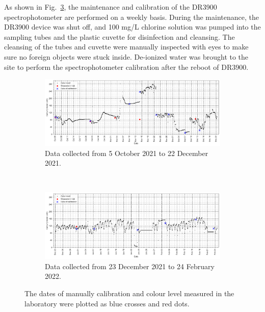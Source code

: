 As shown in Fig.~\ref{fig:colour-calibration-lab-sampling}, the maintenance and calibration of the DR3900 spectrophotometer are performed on a weekly basis. During the maintenance, the DR3900 device was shut off, and 100 mg/L chlorine solution was pumped into the sampling tubes and the plastic cuvette for disinfection and cleansing. The cleansing of the tubes and cuvette were manually inspected with eyes to make sure no foreign objects were stuck inside. De-ionized water was brought to the site to perform the spectrophotometer calibration after the reboot of DR3900.

\begin{figure}[!ht]
  \centering
  \begin{subfigure}[t]{1.0\textwidth}
    \includegraphics[width=\linewidth]{imgs/leachate-effluent-blend-ratio-color-plot/first-80d.png}
    \caption{Data collected from 5 October 2021 to 22 December 2021.} \label{fig:data-oct}
  \end{subfigure}\\
  \vspace{2em}%
  \begin{subfigure}[t]{1.0\textwidth}
    \includegraphics[width=\linewidth]{imgs/leachate-effluent-blend-ratio-color-plot/second-80d.png}
    \caption{Data collected from 23 December 2021 to 24 February 2022.} \label{fig:data-nov}
  \end{subfigure}%
\caption{The dates of manually calibration and colour level measured in the laboratory were plotted as blue crosses and red dots.} \label{fig:colour-calibration-lab-sampling}
\end{figure}

